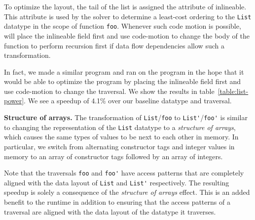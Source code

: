 
To optimize the layout, the tail of the list is assigned the attribute of inlineable. This attribute is used by the solver to
determine a least-cost ordering to the \lstinline|List| datatype in the scope of function \lstinline|foo|. 
Whenever such code motion is possible, \system will place the inlineable field first and use code-motion to change
the body of the function to perform recursion first if data flow dependencies allow such a transformation. 

In fact, we made a similar program and ran \system on the program in the hope that it would be able to optimize the program by placing the inlineable
field first and use code-motion to change the traversal. We show the results in table~\ref{table:list-power}. We see a speedup of 4.1\% 
over our baseline datatype and traversal.

\textbf{Structure of arrays.}
The transformation of
\lstinline|List|/\lstinline|foo| to \lstinline|List'|/\lstinline|foo'|
is similar to
changing the representation of the \lstinline|List| datatype to a
\textit{structure of arrays}, which causes the same types of values to be next to each other in memory.
In particular, we switch from alternating constructor tags and integer values in memory to
an array of constructor tags followed by an array of integers.

Note that the traversals \lstinline|foo| and \lstinline|foo'| have access
patterns that are completely aligned with the data layout of \lstinline|List| and \lstinline|List'| respectively. The resulting speedup 
is solely a consequence of the \textit{structure of arrays} effect. This is an added benefit to the runtime in addition to ensuring that the 
access patterns of a traversal are aligned with the data layout of the datatype it traverses.



